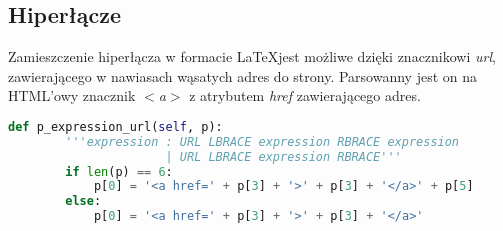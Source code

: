 \subsection{Hiperłącze}

Zamieszczenie hiperłącza w formacie \LaTeX jest możliwe dzięki znacznikowi \textit{url}, 
zawierającego w nawiasach wąsatych adres do strony.
Parsowanny jest on na HTML'owy znacznik \textit{$<$a$>$} z atrybutem \textit{href} zawierającego adres.

\begin{lstlisting}[language={Python}, caption={Hiperłącze}, label={gramatyka-hiperlacze} ]
    def p_expression_url(self, p):
        '''expression : URL LBRACE expression RBRACE expression
                      | URL LBRACE expression RBRACE'''
        if len(p) == 6:
            p[0] = '<a href=' + p[3] + '>' + p[3] + '</a>' + p[5]
        else:
            p[0] = '<a href=' + p[3] + '>' + p[3] + '</a>'
\end{lstlisting}
